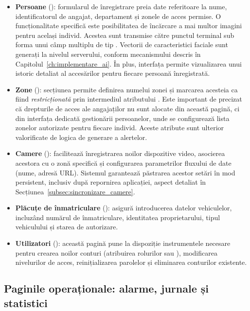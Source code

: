 \documentclass[../../main.tex]{subfiles}
\begin{document}
\begin{itemize} 
	\item \textbf{Persoane} (): formularul de înregistrare preia date referitoare la nume, identificatorul de angajat, departament și zonele de acces permise. O funcționalitate specifică este posibilitatea de încărcare a mai multor imagini pentru același individ. Acestea sunt transmise către punctul terminal  sub forma unui câmp multiplu de tip . Vectorii de caracteristici faciale sunt generați la nivelul serverului, conform mecanismului descris în Capitolul~\ref{ch:implementare_ai}. În plus, interfața permite vizualizarea unui istoric detaliat al accesărilor pentru fiecare persoană înregistrată.
	\item \textbf{Zone} (): secțiunea permite definirea numelui zonei și marcarea acesteia ca fiind \emph{restricționată} prin intermediul atributului \linebreak {}. Este important de precizat că drepturile de acces ale angajaților nu sunt alocate din această pagină, ci din interfața dedicată gestionării persoanelor, unde se configurează lista zonelor autorizate pentru fiecare individ. Aceste atribute sunt ulterior valorificate de logica de generare a alertelor.
	\item \textbf{Camere} (): facilitează înregistrarea noilor dispozitive video, asocierea acestora cu o zonă specifică și configurarea parametrilor fluxului de date (nume, adresă URL). Sistemul garantează păstrarea acestor setări în mod persistent, inclusiv după repornirea aplicației, aspect detaliat în Secțiunea~\ref{subsec:sincronizare_camere}.
	\item \textbf{Plăcuțe de înmatriculare} (): asigură introducerea datelor vehiculelor, incluzând numărul de înmatriculare, identitatea proprietarului, tipul vehiculului și starea de autorizare.
	\item \textbf{Utilizatori} (): această pagină pune la dispoziție instrumentele necesare pentru crearea noilor conturi (atribuirea rolurilor  sau ), modificarea nivelurilor de acces, reinițializarea parolelor și eliminarea conturilor existente.
\end{itemize}

\subsection{Paginile operaționale: alarme, jurnale și statistici}
\end{document}

